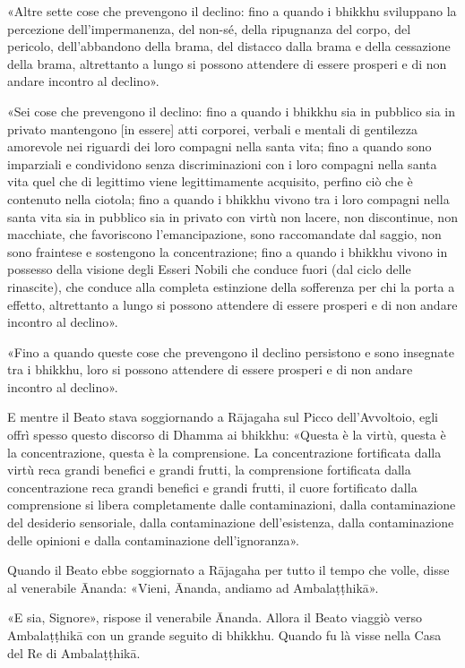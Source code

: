 «Altre sette cose che prevengono il declino: fino a quando i bhikkhu
sviluppano la percezione dell’impermanenza, del non-sé, della ripugnanza
del corpo, del pericolo, dell’abbandono della brama, del distacco dalla
brama e della cessazione della brama, altrettanto a lungo si possono
attendere di essere prosperi e di non andare incontro al declino».




«Sei cose che prevengono il declino: fino a quando i bhikkhu sia in
pubblico sia in privato mantengono [in essere] atti corporei, verbali e
mentali di gentilezza amorevole nei riguardi dei loro compagni nella
santa vita; fino a quando sono imparziali e condividono senza
discriminazioni con i loro compagni nella santa vita quel che di
legittimo viene legittimamente acquisito, perfino ciò che è contenuto
nella ciotola; fino a quando i bhikkhu vivono tra i loro compagni nella
santa vita sia in pubblico sia in privato con virtù non lacere, non
discontinue, non macchiate, che favoriscono l’emancipazione, sono
raccomandate dal saggio, non sono fraintese e sostengono la
concentrazione; fino a quando i bhikkhu vivono in possesso della visione
degli Esseri Nobili che conduce fuori (dal ciclo delle rinascite), che
conduce alla completa estinzione della sofferenza per chi la porta a
effetto, altrettanto a lungo si possono attendere di essere prosperi e
di non andare incontro al declino».


«Fino a quando queste cose che prevengono il declino persistono e sono
insegnate tra i bhikkhu, loro si possono attendere di essere prosperi e
di non andare incontro al declino».


E mentre il Beato stava soggiornando a Rājagaha sul Picco
dell’Avvoltoio, egli offrì spesso questo discorso di Dhamma ai bhikkhu:
«Questa è la virtù, questa è la concentrazione, questa è la
comprensione. La concentrazione fortificata dalla virtù reca grandi
benefici e grandi frutti, la comprensione fortificata dalla
concentrazione reca grandi benefici e grandi frutti, il cuore
fortificato dalla comprensione si libera completamente dalle
contaminazioni, dalla contaminazione del desiderio sensoriale, dalla
contaminazione dell’esistenza, dalla contaminazione delle opinioni e
dalla contaminazione dell’ignoranza».


Quando il Beato ebbe soggiornato a Rājagaha per tutto il tempo che
volle, disse al venerabile Ānanda: «Vieni, Ānanda, andiamo ad
Ambalaṭṭhikā».


«E sia, Signore», rispose il venerabile Ānanda. Allora il Beato viaggiò
verso Ambalaṭṭhikā con un grande seguito di bhikkhu. Quando fu là visse
nella Casa del Re di Ambalaṭṭhikā.


